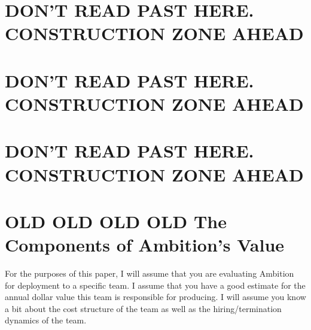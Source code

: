 \documentclass[paper=a4, fontsize=11pt abstract]{scrartcl}
\numberwithin{equation}{section}		%
\numberwithin{figure}{section}			%
\numberwithin{table}{section}				%
\begin{document}
\section{DON'T READ PAST HERE. CONSTRUCTION ZONE AHEAD}
\section{DON'T READ PAST HERE. CONSTRUCTION ZONE AHEAD}
\section{DON'T READ PAST HERE. CONSTRUCTION ZONE AHEAD}

\section{OLD OLD OLD OLD The Components of Ambition's Value}
For the purposes of this paper, I will assume that you are evaluating Ambition for deployment to a specific team.  I assume that you have a good estimate for the annual dollar value this team is responsible for producing.  I will assume you know a bit about the cost structure of the team as well as the hiring/termination dynamics of the team.
\end{document}
